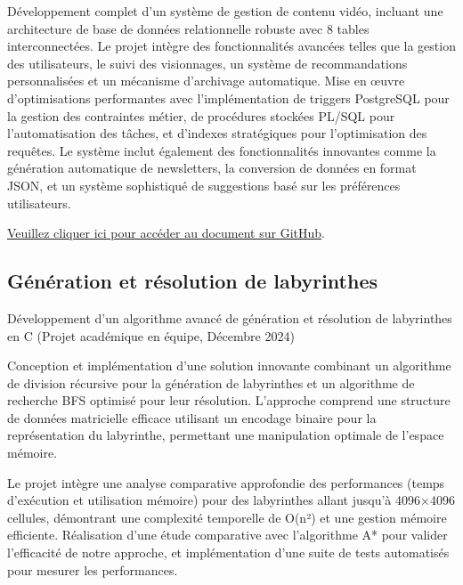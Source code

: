 \documentclass{article}
\begin{document}
    Développement complet d'un système de gestion de contenu vidéo, incluant une architecture de base de données relationnelle robuste avec 8 tables interconnectées. Le projet intègre des fonctionnalités avancées telles que la gestion des utilisateurs, le suivi des visionnages, un système de recommandations personnalisées et un mécanisme d'archivage automatique. Mise en œuvre d'optimisations performantes avec l'implémentation de triggers PostgreSQL pour la gestion des contraintes métier, de procédures stockées PL/SQL pour l'automatisation des tâches, et d'indexes stratégiques pour l'optimisation des requêtes. Le système inclut également des fonctionnalités innovantes comme la génération automatique de newsletters, la conversion de données en format JSON, et un système sophistiqué de suggestions basé sur les préférences utilisateurs.
    \newline
    \newline
    \newline

    \href{https://github.com/jafarizadeh/CV---lettre/tree/2c50806438650ea894402f5cec3c73276cccaadc/Document/Projets/D%C3%A9veloppement%20d'un%20Syst%C3%A8me%20de%20Base%20de%20Donn%C3%A9es}{Veuillez cliquer ici pour accéder au document sur GitHub}.

    \newpage
    
    \subsection{Génération et résolution de labyrinthes}
    Développement d'un algorithme avancé de génération et résolution de labyrinthes en C (Projet académique en équipe, Décembre 2024)


    Conception et implémentation d'une solution innovante combinant un algorithme de division récursive pour la génération de labyrinthes et un algorithme de recherche BFS optimisé pour leur résolution. L'approche comprend une structure de données matricielle efficace utilisant un encodage binaire pour la représentation du labyrinthe, permettant une manipulation optimale de l'espace mémoire. 
    
    Le projet intègre une analyse comparative approfondie des performances (temps d'exécution et utilisation mémoire) pour des labyrinthes allant jusqu'à 4096×4096 cellules, démontrant une complexité temporelle de O(n²) et une gestion mémoire efficiente. Réalisation d'une étude comparative avec l'algorithme A* pour valider l'efficacité de notre approche, et implémentation d'une suite de tests automatisés pour mesurer les performances.
    \newline
    \newline
    \newline
    
\end{document}
